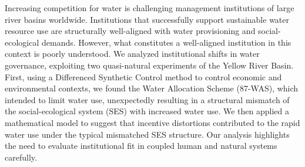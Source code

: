 Increasing competition for water is challenging management institutions of large river basins worldwide. Institutions that successfully support sustainable water resource use are structurally well-aligned with water provisioning and social-ecological demands. However, what constitutes a well-aligned institution in this context is poorly understood. We analyzed institutional shifts in water governance, exploiting two quasi-natural experiments of the Yellow River Basin. First, using a Differenced Synthetic Control method to control economic and environmental contexts, we found the Water Allocation Scheme (87-WAS), which intended to limit water use, unexpectedly resulting in a structural mismatch of the social-ecological system (SES) with increased water use. We then applied a mathematical model to suggest that incentive distortions contributed to the rapid water use under the typical mismatched SES structure. Our analysis highlights the need to evaluate institutional fit in coupled human and natural systems carefully.
